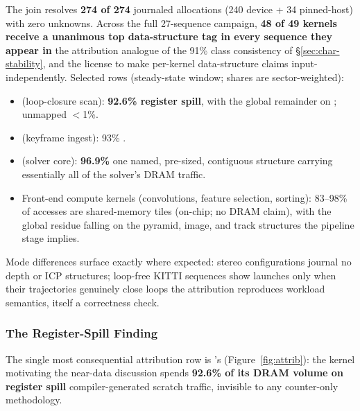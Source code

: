 The join resolves \textbf{274 of 274} journaled allocations (240 device + 34 pinned-host) with zero unknowns. Across the full 27-sequence campaign, \textbf{48 of 49 kernels receive a unanimous top data-structure tag in every sequence they appear in} the attribution analogue of the 91\% class consistency of \S\ref{sec:char-stability}, and the license to make per-kernel data-structure claims input-independently. Selected rows (steady-state window; shares are sector-weighted):

\begin{itemize}
  \item \stTrack{} (loop-closure scan): \textbf{92.6\% register spill}, with the global remainder on ; unmapped $<$1\%.
  \item \stBuild{} (keyframe ingest): 93\% .
  \item {} (solver core): \textbf{96.9\% } one named, pre-sized, contiguous structure carrying essentially all of the solver’s DRAM traffic.
  \item Front-end compute kernels (convolutions, feature selection, sorting): 83--98\% of accesses are shared-memory tiles (on-chip; no DRAM claim), with the global residue falling on the pyramid, image, and track structures the pipeline stage implies.
\end{itemize}

Mode differences surface exactly where expected: stereo configurations journal no depth or ICP structures; loop-free KITTI sequences show \stTrack{} launches only when their trajectories genuinely close loops the attribution reproduces workload semantics, itself a correctness check.

\subsubsection{The Register-Spill Finding}
\label{sec:attr-spill}

The single most consequential attribution row is \stTrack{}'s (Figure~\ref{fig:attrib}): the kernel motivating the near-data discussion spends \textbf{92.6\% of its DRAM volume on register spill} compiler-generated scratch traffic, invisible to any counter-only methodology.

